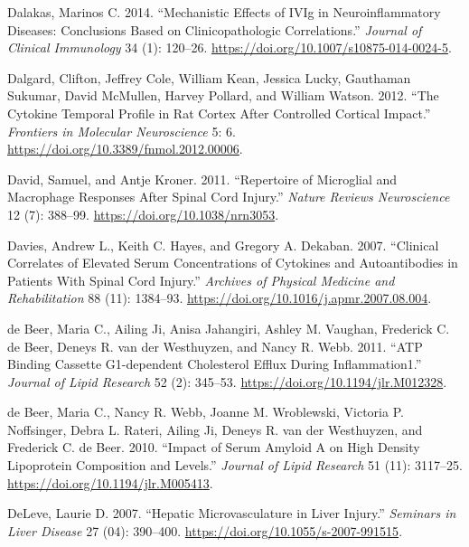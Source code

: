 \documentclass[9pt,lineno]{elife}
\newlength{\cslhangindent}
\newlength{\cslentryspacingunit} %
\newenvironment{CSLReferences}[2] %
 {%
  \setlength{\parindent}{0pt}
  \ifodd #1
  \let\oldpar\par
  \def\par{\hangindent=\cslhangindent\oldpar}
  \fi
  \setlength{\parskip}{#2\cslentryspacingunit}
 }%
 {}
\begin{document}
\begin{landscape}
\begin{landscape}
\begin{landscape}
\begin{landscape}
\begin{CSLReferences}{1}{0}
\leavevmode{}%
Dalakas, Marinos C. 2014. {``Mechanistic {Effects} of {IVIg} in {Neuroinflammatory Diseases}: {Conclusions Based} on {Clinicopathologic Correlations}.''} \emph{Journal of Clinical Immunology} 34 (1): 120--26. \url{https://doi.org/10.1007/s10875-014-0024-5}.

\leavevmode{}%
Dalgard, Clifton, Jeffrey Cole, William Kean, Jessica Lucky, Gauthaman Sukumar, David McMullen, Harvey Pollard, and William Watson. 2012. {``The Cytokine Temporal Profile in Rat Cortex After Controlled Cortical Impact.''} \emph{Frontiers in Molecular Neuroscience} 5: 6. \url{https://doi.org/10.3389/fnmol.2012.00006}.

\leavevmode{}%
David, Samuel, and Antje Kroner. 2011. {``Repertoire of Microglial and Macrophage Responses After Spinal Cord Injury.''} \emph{Nature Reviews Neuroscience} 12 (7): 388--99. \url{https://doi.org/10.1038/nrn3053}.

\leavevmode{}%
Davies, Andrew L., Keith C. Hayes, and Gregory A. Dekaban. 2007. {``Clinical {Correlates} of {Elevated Serum Concentrations} of {Cytokines} and {Autoantibodies} in {Patients With Spinal Cord Injury}.''} \emph{Archives of Physical Medicine and Rehabilitation} 88 (11): 1384--93. \url{https://doi.org/10.1016/j.apmr.2007.08.004}.

\leavevmode{}%
de Beer, Maria C., Ailing Ji, Anisa Jahangiri, Ashley M. Vaughan, Frederick C. de Beer, Deneys R. van der Westhuyzen, and Nancy R. Webb. 2011. {``{ATP} Binding Cassette {G1-dependent} Cholesterol Efflux During Inflammation1.''} \emph{Journal of Lipid Research} 52 (2): 345--53. \url{https://doi.org/10.1194/jlr.M012328}.

\leavevmode{}%
de Beer, Maria C., Nancy R. Webb, Joanne M. Wroblewski, Victoria P. Noffsinger, Debra L. Rateri, Ailing Ji, Deneys R. van der Westhuyzen, and Frederick C. de Beer. 2010. {``Impact of Serum Amyloid {A} on High Density Lipoprotein Composition and Levels.''} \emph{Journal of Lipid Research} 51 (11): 3117--25. \url{https://doi.org/10.1194/jlr.M005413}.

\leavevmode{}%
DeLeve, Laurie D. 2007. {``Hepatic {Microvasculature} in {Liver Injury}.''} \emph{Seminars in Liver Disease} 27 (04): 390--400. \url{https://doi.org/10.1055/s-2007-991515}.


\end{CSLReferences}
\end{landscape}
\end{landscape}
\end{landscape}
\end{landscape}
\end{document}
